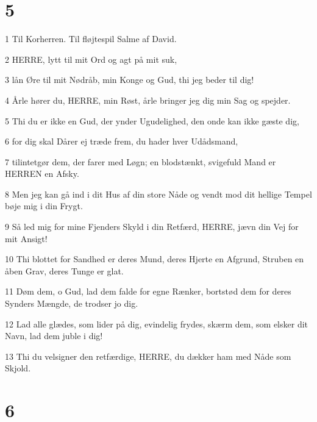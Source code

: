 \chapter{5}

\par 1 Til Korherren. Til fløjtespil Salme af David.
\par 2 HERRE, lytt til mit Ord og agt på mit suk,
\par 3 lån Øre til mit Nødråb, min Konge og Gud, thi jeg beder til dig!
\par 4 Årle hører du, HERRE, min Røst, årle bringer jeg dig min Sag og spejder.
\par 5 Thi du er ikke en Gud, der ynder Ugudelighed, den onde kan ikke gæste dig,
\par 6 for dig skal Dårer ej træde frem, du hader hver Udådsmand,
\par 7 tilintetgør dem, der farer med Løgn; en blodstænkt, svigefuld Mand er HERREN en Afsky.
\par 8 Men jeg kan gå ind i dit Hus af din store Nåde og vendt mod dit hellige Tempel bøje mig i din Frygt.
\par 9 Så led mig for mine Fjenders Skyld i din Retfærd, HERRE, jævn din Vej for mit Ansigt!
\par 10 Thi blottet for Sandhed er deres Mund, deres Hjerte en Afgrund, Struben en åben Grav, deres Tunge er glat.
\par 11 Døm dem, o Gud, lad dem falde for egne Rænker, bortstød dem for deres Synders Mængde, de trodser jo dig.
\par 12 Lad alle glædes, som lider på dig, evindelig frydes, skærm dem, som elsker dit Navn, lad dem juble i dig!
\par 13 Thi du velsigner den retfærdige, HERRE, du dækker ham med Nåde som Skjold.

\chapter{6}

